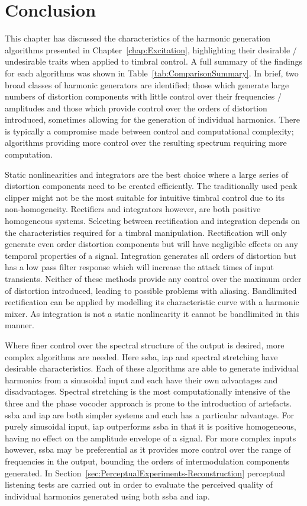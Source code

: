 \section{Conclusion}
	This chapter has discussed the characteristics of the harmonic generation algorithms presented in
	Chapter~\ref{chap:Excitation}, highlighting their desirable / undesirable traits when applied to timbral control.
	A full summary of the findings for each algorithms was shown in Table~\ref{tab:ComparisonSummary}. In brief, two
	broad classes of harmonic generators are identified; those which generate large numbers of distortion components
	with little control over their frequencies / amplitudes and those which provide control over the orders of
	distortion introduced, sometimes allowing for the generation of individual harmonics. There is typically a
	compromise made between control and computational complexity; algorithms providing more control over the resulting
	spectrum requiring more computation.

	Static nonlinearities and integrators are the best choice where a large series of distortion components need to be
	created efficiently. The traditionally used peak clipper might not be the most suitable for intuitive timbral
	control due to its non-homogeneity. Rectifiers and integrators however, are both positive homogeneous systems.
	Selecting between rectification and integration depends on the characteristics required for a timbral manipulation.
	Rectification will only generate even order distortion components but will have negligible effects on any temporal
	properties of a signal. Integration generates all orders of distortion but has a low pass filter response which
	will increase the attack times of input transients. Neither of these methods provide any control over the maximum
	order of distortion introduced, leading to possible problems with aliasing. Bandlimited rectification can be
	applied by modelling its characteristic curve with a harmonic mixer. As integration is not a static nonlinearity it
	cannot be bandlimited in this manner.

	Where finer control over the spectral structure of the output is desired, more complex algorithms are needed. Here
	\acrshort{ssba}, \acrshort{iap} and spectral stretching have desirable characteristics. Each of these algorithms
	are able to generate individual harmonics from a sinusoidal input and each have their own advantages and
	disadvantages. Spectral stretching is the most computationally intensive of the three and the phase vocoder
	approach is prone to the introduction of artefacts. \acrshort{ssba} and \acrshort{iap} are both simpler systems and
	each has a particular advantage. For purely sinusoidal input, \acrshort{iap} outperforms \acrshort{ssba} in that it
	is positive homogeneous, having no effect on the amplitude envelope of a signal. For more complex inputs however,
	\acrshort{ssba} may be preferential as it provides more control over the range of frequencies in the output,
	bounding the orders of intermodulation components generated. In
	Section~\ref{sec:PerceptualExperiments-Reconstruction} perceptual listening tests are carried out in order to
	evaluate the perceived quality of individual harmonics generated using both \acrshort{ssba} and \acrshort{iap}.

